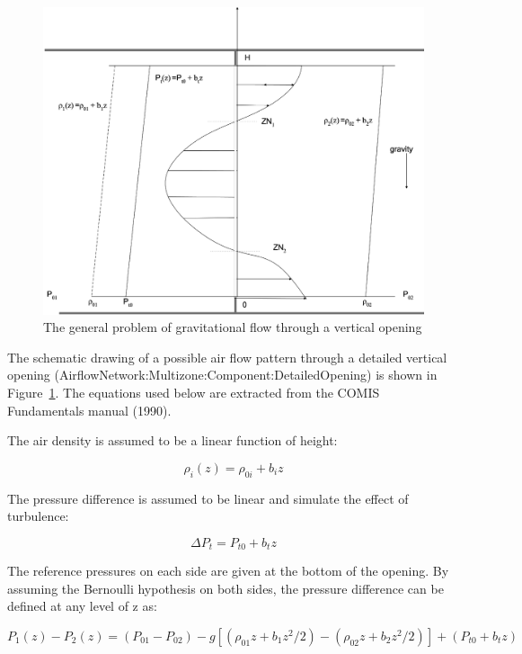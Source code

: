 \begin{figure}[hbtp] %
\centering
\includegraphics[width=0.9\linewidth, height=0.9\textheight, keepaspectratio=true]{media/image2691.svg.png}
\caption{The general problem of gravitational flow through a vertical opening \protect \label{fig:the-general-problem-of-gravitational-flow}}
\end{figure}

The schematic drawing of a possible air flow pattern through a detailed vertical opening (AirflowNetwork:Multizone:Component:DetailedOpening) is shown in Figure~\ref{fig:the-general-problem-of-gravitational-flow}. The equations used below are extracted from the COMIS Fundamentals manual (1990).

The air density is assumed to be a linear function of height:

\begin{equation}
{\rho_i}(z) = {\rho_{0i}} + {b_i}z
\end{equation}

The pressure difference is assumed to be linear and simulate the effect of turbulence:

\begin{equation}
\Delta P_t = P_{t0} + b_t z
\end{equation}

The reference pressures on each side are given at the bottom of the opening. By assuming the Bernoulli hypothesis on both sides, the pressure difference can be defined at any level of z as:

\begin{equation}
{P_1}(z) - {P_2}(z) = ({P_{01}} - {P_{02}}) - g\left[ {({\rho_{01}}z + {b_1}{z^2}/2) - ({\rho_{02}}z + {b_2}{z^2}/2)} \right] + ({P_{t0}} + {b_t}z)
\end{equation}

